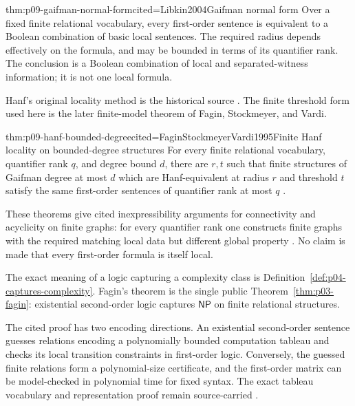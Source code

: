 \begin{hbtheorem}{thm:p09-gaifman-normal-form}{cited=Libkin2004}{Gaifman normal form}
Over a fixed finite relational vocabulary, every first-order sentence is
equivalent to a Boolean combination of basic local sentences.  The required
radius depends effectively on the formula, and may be bounded in terms of its
quantifier rank.  The conclusion is a Boolean combination of local and
separated-witness information; it is not one local formula.
\end{hbtheorem}

Hanf's original locality method is the historical source
\cite{Hanf1965}.  The finite threshold form used here is the later
finite-model theorem of Fagin, Stockmeyer, and Vardi.

\begin{hbtheorem}{thm:p09-hanf-bounded-degree}{cited=FaginStockmeyerVardi1995}{Finite Hanf locality on bounded-degree structures}
For every finite relational vocabulary, quantifier rank \(q\), and degree bound
\(d\), there are \(r,t\) such that finite structures of Gaifman degree at most
\(d\) which are Hanf-equivalent at radius \(r\) and threshold \(t\) satisfy the
same first-order sentences of quantifier rank at most \(q\)
\cite{Libkin2004}.
\end{hbtheorem}

These theorems give cited inexpressibility arguments for connectivity and
acyclicity on finite graphs: for every quantifier rank one constructs finite
graphs with the required matching local data but different global property
\cite{EbbinghausFlum1995,Libkin2004}.  No claim is made that every
first-order formula is itself local.

The exact meaning of a logic capturing a complexity class is
Definition~\ref{def:p04-captures-complexity}.  Fagin's theorem is the single
public Theorem~\ref{thm:p03-fagin}: existential second-order logic captures
\(\mathsf{NP}\) on finite relational structures.

\noindent The cited proof has two encoding directions.  An existential
second-order sentence guesses relations encoding a polynomially
bounded computation tableau and checks its local transition constraints in
first-order logic. Conversely, the guessed finite relations form a
polynomial-size certificate, and the first-order matrix can be model-checked
in polynomial time for fixed syntax.  The exact tableau vocabulary and
representation proof remain source-carried
\cite{Fagin1974,Immerman1999}.

